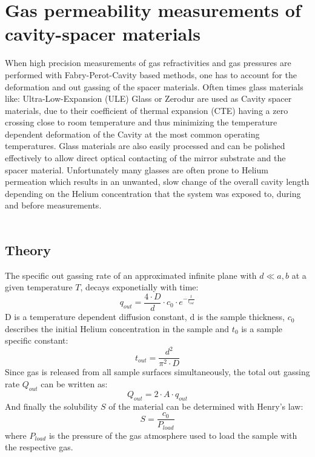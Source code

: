 \chapter{Gas permeability measurements of cavity-spacer materials}
When high precision measurements of gas refractivities and gas pressures are performed with Fabry-Perot-Cavity based methods, one has to account for the deformation and out gassing of the spacer materials. Often times glass materials like: Ultra-Low-Expansion (ULE) Glass or Zerodur are used as Cavity spacer materials, due to their coefficient of thermal expansion (CTE) having a zero crossing close to room temperature and thus minimizing the temperature dependent deformation of the Cavity at the most common operating temperatures. Glass materials are also easily processed and can be polished effectively to allow direct optical contacting of the mirror substrate and the spacer material. Unfortunately many glasses are often prone to Helium permeation which results in an unwanted, slow change of the overall cavity length depending on the Helium concentration that the system was exposed to, during and before measurements.\\ \\
\noindent
\section{Theory}
The specific out gassing rate of an approximated infinite plane with $d\ll a,b$ at a given temperature $T$, decays exponetially with time:
\begin{equation}
	q_{out} = \frac{4 \cdot D}{d} \cdot c_0\cdot e^{-\frac{t}{t_{out}}}
	\label{outgassing_rate}
\end{equation}
D is a temperature dependent diffusion constant, d is the sample thickness, $c_0$ describes the initial Helium concentration in the sample and $t_0$ is a sample specific constant:
\begin{equation}
	t_{out} = \frac{d^2}{\pi^2 \cdot D}
	\label{outgassing_timeconstant}
\end{equation}
Since gas is released from all sample surfaces simultaneously, the total out gassing rate $Q_{out}$ can be written as:
\begin{equation}
	Q_{out} = 2 \cdot A \cdot q_{out}
\end{equation}
And finally the solubility $S$ of the material can be determined with Henry's law:
\begin{equation}
	S = \frac{c_0}{P_{load}}
\end{equation}
where $P_{load}$ is the pressure of the gas atmosphere used to load the sample with the respective gas.
